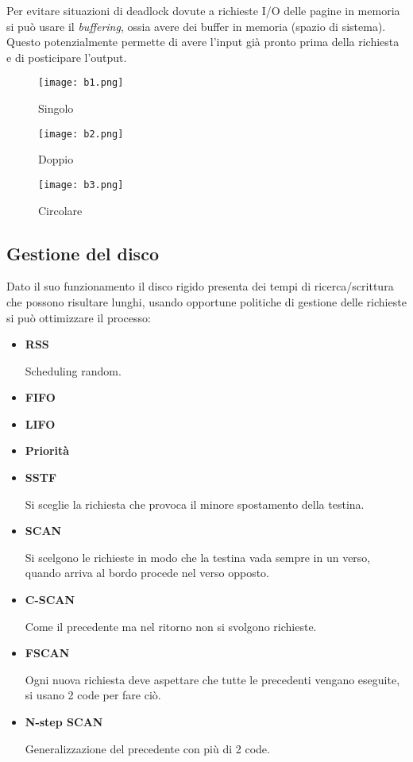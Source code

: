 \documentclass{article}
\begin{document}
\noindent Per evitare situazioni di deadlock dovute a richieste I/O delle pagine in memoria si può usare il \textit{buffering}, ossia avere dei buffer in memoria (spazio di sistema). Questo potenzialmente permette di avere l'input già pronto prima della richiesta e di posticipare l'output.\newline

\begin{figure}[ht]
    \centering
    \texttt{[image: b1.png]}
    \caption*{Singolo}
    \vspace{10pt}
    \texttt{[image: b2.png]}
    \caption*{Doppio}
    \vspace{10pt}
    \texttt{[image: b3.png]}
    \caption*{Circolare}
    
    \label{fig:buf}
\end{figure}

\newpage

\subsection{Gestione del disco}

Dato il suo funzionamento il disco rigido presenta dei tempi di ricerca/scrittura che possono risultare lunghi, usando opportune politiche di gestione delle richieste si può ottimizzare il processo:
\begin{itemize}
    \item \textbf{RSS}

        Scheduling random.
        
    \item \textbf{FIFO}    
    \item \textbf{LIFO}
    \item \textbf{Priorità}

    \item \textbf{SSTF}

        Si sceglie la richiesta che provoca il minore spostamento della testina.

    \item \textbf{SCAN}

        Si scelgono le richieste in modo che la testina vada sempre in un verso, quando arriva al bordo procede nel verso opposto.

    \item \textbf{C-SCAN}

        Come il precedente ma nel ritorno non si svolgono richieste.

    \item \textbf{FSCAN}

        Ogni nuova richiesta deve aspettare che tutte le precedenti vengano eseguite, si usano 2 code per fare ciò.

    \item \textbf{N-step SCAN}

        Generalizzazione del precedente con più di 2 code.\newline
        
\end{itemize}
\end{document}
